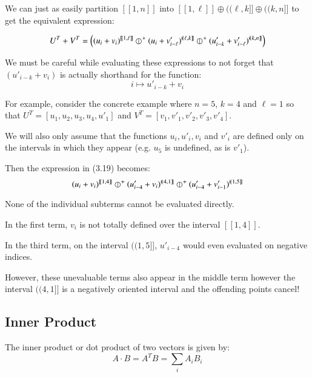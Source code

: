 We can just as easily partition $[\![1,n]\!]$ into $[\![1,\ell]\!] \oplus (\!(\ell, k]\!] \oplus (\!(k, n]\!]$ to get the equivalent expression:

\begin{equation}
	U^T + V^T = \left( (u_i + v_i)^{[\![1, \ell]\!]} 
		\hjoin[+] (u_{i} + v'_{i-\ell})^{(\!(\ell,k]\!]} 
		\hjoin[+] (u'_{i-k}+v'_{i-\ell})^{(\!(k,n]\!]} \right)
\end{equation}

We must be careful while evaluating these expressions to not forget that $(u'_{i-k} + v_i)$ is actually shorthand for the function:
\begin{equation*}
	i \mapsto u'_{i-k} + v_i
\end{equation*}

For example, consider the concrete example where $n=5$, $k=4$ and $\ell = 1$ so that
$U^T = [ u_1, u_2, u_3, u_4, u'_1 ]$ and
$V^T = [ v_1, v'_1, v'_2, v'_3, v'_4 ]$.

We will also only assume that the functions $u_i, u'_i, v_i$ and $v'_i$ are defined only on the intervals in which they appear (e.g. $u_5$ is undefined, as is $v'_1$).

Then the expression in (3.19) becomes:
\begin{equation}
(u_i + v_i)^{[\![1,4]\!]} \hjoin[+] (u'_{i-4} + v_i)^{(\!(4,1]\!]} \hjoin[+] (u'_{i-4} + v'_{i-1})^{(\!(1,5]\!]}
\end{equation}

None of the individual subterms cannot be evaluated directly.

In the first term, $v_i$ is not totally defined over the interval $[\![1,4]\!]$.

In the third term, on the interval $(\!(1,5]\!]$, $u'_{i-4}$ would even evaluated on negative indices.

However, these unevaluable terms also appear in the middle term however the interval $(\!(4,1]\!]$ is a negatively oriented interval and the offending points cancel!




\subsection{Inner Product}

The inner product or dot product of two vectors is given by:
\begin{equation}
A \cdot B = A^T B = \sum_i A_i B_i
\end{equation}


